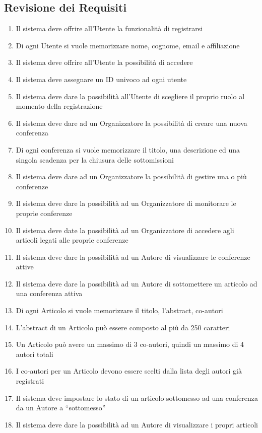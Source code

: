 \subsection{Revisione dei Requisiti}
\label{sec:revisione_requisiti}

\begin{enumerate}
\item Il sistema deve offrire all'Utente la funzionalità di registrarsi
\item Di ogni Utente si vuole memorizzare nome, cognome, email e affiliazione
\item Il sistema deve offrire all'Utente la possibilità di accedere
\item Il sistema deve assegnare un ID univoco ad ogni utente
\item Il sistema deve dare la possibilità all'Utente di scegliere il proprio ruolo al momento della registrazione
\item Il sistema deve dare ad un Organizzatore la possibilità di creare una nuova conferenza
\item Di ogni conferenza si vuole memorizzare il titolo, una descrizione ed una singola scadenza
  per la chiusura delle sottomissioni
\item Il sistema deve dare ad un Organizzatore la possibilità di gestire una o più conferenze
\item Il sistema deve dare la possibilità ad un Organizzatore di monitorare le proprie conferenze
\item Il sistema deve date la possibilità ad un Organizzatore di accedere agli articoli legati alle proprie conferenze
\item Il sistema deve dare la possibilità ad un Autore di visualizzare le conferenze attive
\item Il sistema deve dare la possibilità ad un Autore di sottomettere un articolo ad una conferenza attiva
\item Di ogni Articolo si vuole memorizzare il titolo, l'abstract, co-autori
\item L'abstract di un Articolo può essere composto al più da 250 caratteri
\item Un Articolo può avere un massimo di 3 co-autori, quindi un massimo di 4 autori totali
\item I co-autori per un Articolo devono essere scelti dalla lista degli autori già registrati
\item Il sistema deve impostare lo stato di un articolo sottomesso ad una conferenza da un Autore a ``sottomesso''
\item Il sistema deve dare la possibilità ad un Autore di visualizzare i propri articoli

\end{enumerate}
